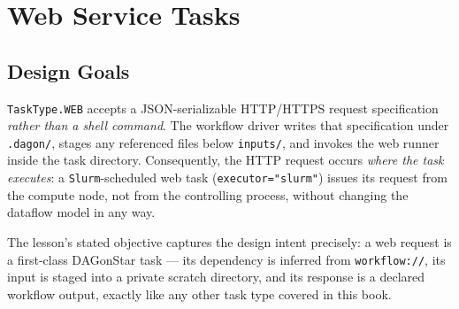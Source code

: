 \chapter{Web Service Tasks}
\label{ch:web-tasks}

\section{Design Goals}

\texttt{TaskType.WEB} accepts a JSON-serializable HTTP/HTTPS request
specification \emph{rather than a shell command}. The workflow driver writes
that specification under \texttt{.dagon/}, stages any referenced files below
\texttt{inputs/}, and invokes the web runner inside the task directory.
Consequently, the HTTP request occurs \emph{where the task executes}: a
\texttt{Slurm}-scheduled web task (\texttt{executor="slurm"}) issues its
request from the compute node, not from the controlling process, without
changing the dataflow model in any way.

\begin{practicebox}
The lesson's stated objective captures the design intent precisely: a web
request is a first-class DAGonStar task --- its dependency is inferred from
\texttt{workflow://}, its input is staged into a private scratch directory,
and its response is a declared workflow output, exactly like any other task
type covered in this book.
\end{practicebox}

